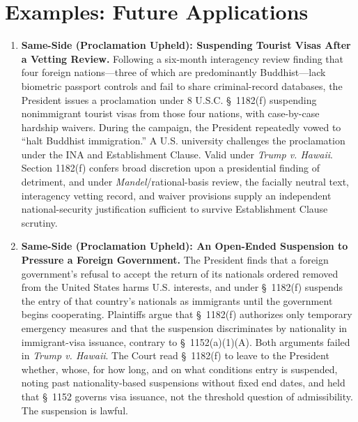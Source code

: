 \documentclass[12pt]{article}
\begin{document}
\section{Examples: Future Applications}
\begin{enumerate}

\item \textbf{Same-Side (Proclamation Upheld): Suspending Tourist Visas After a Vetting Review.} Following a six-month interagency review finding that four foreign nations---three of which are predominantly Buddhist---lack biometric passport controls and fail to share criminal-record databases, the President issues a proclamation under 8 U.S.C. \S~1182(f) suspending nonimmigrant tourist visas from those four nations, with case-by-case hardship waivers. During the campaign, the President repeatedly vowed to ``halt Buddhist immigration.'' A U.S. university challenges the proclamation under the INA and Establishment Clause. Valid under \textit{Trump v. Hawaii}. Section 1182(f) confers broad discretion upon a presidential finding of detriment, and under \textit{Mandel}/rational-basis review, the facially neutral text, interagency vetting record, and waiver provisions supply an independent national-security justification sufficient to survive Establishment Clause scrutiny.

\item \textbf{Same-Side (Proclamation Upheld): An Open-Ended Suspension to Pressure a Foreign Government.} The President finds that a foreign government's refusal to accept the return of its nationals ordered removed from the United States harms U.S. interests, and under \S~1182(f) suspends the entry of that country's nationals as immigrants until the government begins cooperating. Plaintiffs argue that \S~1182(f) authorizes only temporary emergency measures and that the suspension discriminates by nationality in immigrant-visa issuance, contrary to \S~1152(a)(1)(A). Both arguments failed in \textit{Trump v. Hawaii}. The Court read \S~1182(f) to leave to the President whether, whose, for how long, and on what conditions entry is suspended, noting past nationality-based suspensions without fixed end dates, and held that \S~1152 governs visa issuance, not the threshold question of admissibility. The suspension is lawful.


\end{enumerate}
\end{document}
